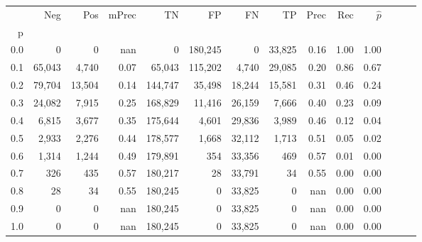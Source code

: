 \begin{tabular}{rrrrrrrrrrrrrr}
\toprule
{} &     Neg &     Pos & mPrec &       TN &       FP &      FN &      TP &  Prec &   Rec & $\hat{p}$ \\
p   &         &         &       &          &          &         &         &       &       &           \\
\midrule
0.0 &       0 &       0 &   nan &        0 &  180,245 &       0 &  33,825 &  0.16 &  1.00 &      1.00 \\
0.1 &  65,043 &   4,740 &  0.07 &   65,043 &  115,202 &   4,740 &  29,085 &  0.20 &  0.86 &      0.67 \\
0.2 &  79,704 &  13,504 &  0.14 &  144,747 &   35,498 &  18,244 &  15,581 &  0.31 &  0.46 &      0.24 \\
0.3 &  24,082 &   7,915 &  0.25 &  168,829 &   11,416 &  26,159 &   7,666 &  0.40 &  0.23 &      0.09 \\
0.4 &   6,815 &   3,677 &  0.35 &  175,644 &    4,601 &  29,836 &   3,989 &  0.46 &  0.12 &      0.04 \\
0.5 &   2,933 &   2,276 &  0.44 &  178,577 &    1,668 &  32,112 &   1,713 &  0.51 &  0.05 &      0.02 \\
0.6 &   1,314 &   1,244 &  0.49 &  179,891 &      354 &  33,356 &     469 &  0.57 &  0.01 &      0.00 \\
0.7 &     326 &     435 &  0.57 &  180,217 &       28 &  33,791 &      34 &  0.55 &  0.00 &      0.00 \\
0.8 &      28 &      34 &  0.55 &  180,245 &        0 &  33,825 &       0 &   nan &  0.00 &      0.00 \\
0.9 &       0 &       0 &   nan &  180,245 &        0 &  33,825 &       0 &   nan &  0.00 &      0.00 \\
1.0 &       0 &       0 &   nan &  180,245 &        0 &  33,825 &       0 &   nan &  0.00 &      0.00 \\
\bottomrule
\end{tabular}
